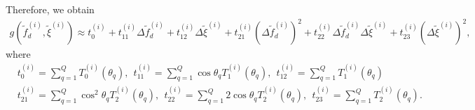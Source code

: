 \documentclass[12pt, draftclsnofoot, onecolumn]{IEEEtran}
\begin{document}
Therefore, we obtain
\begin{align} \label{QuadraticFun1}
g\left( {{{\tilde{f}}}_{d}^{(i)}}, {\tilde{\xi}}^{(i)} \right)
 \approx {{t}_{0}^{\left( i \right)}}+{{t}_{11}^{\left( i \right)}} \Delta {{\tilde f}_{d}^{\left( i \right)}} + {{t}_{12}^{\left( i \right)}} \Delta \tilde\xi^{\left( i \right)} + {{t}_{21}^{\left( i \right)}} {{\left( \Delta {{\tilde f}_{d}^{\left( i \right)}} \right)}^{2}} + {{t}_{22}^{\left( i \right)}} \Delta {{\tilde f}_{d}^{\left( i \right)}}\Delta \tilde \xi^{\left( i \right)} + {{t}_{23}^{\left( i \right)}} {{\left( \Delta \tilde \xi^{\left( i \right)}  \right)}^{2}},
\end{align}
where
\begin{align*}
& {{t}_{0}^{\left( i \right)}}=\sum\nolimits_{q=1}^{Q}{{{T}_{0}^{\left( i \right)}}\left( {{\theta }_{q}} \right)},\ \ {{t}_{11}^{\left( i \right)}}=\sum\nolimits_{q=1}^{Q}{\cos{{\theta }_{q}}{{T}_{1}^{\left( i \right)}}\left( {{\theta }_{q}} \right)}, \ \ {{t}_{12}^{\left( i \right)}}=\sum\nolimits_{q=1}^{Q}{{{T}_{1}^{\left( i \right)}}\left( {{\theta }_{q}} \right)\ } \nonumber \\
& {{t}_{21}^{\left( i \right)}}=\sum\nolimits_{q=1}^{Q}{{\cos}^{2}{{\theta }_{q}}{{T}_{2}^{\left( i \right)}}\left( {{\theta }_{q}} \right)}, \ \ {{t}_{22}^{\left( i \right)}}=\sum\nolimits_{q=1}^{Q}{2\cos{{\theta }_{q}}{{T}_{2}^{\left( i \right)}}\left( {{\theta }_{q}} \right)},\ \ {{t}_{23}^{\left( i \right)}}=\sum\nolimits_{q=1}^{Q}{{{T}_{2}^{\left( i \right)}}\left( {{\theta }_{q}} \right)}.
\end{align*}
\end{document}
